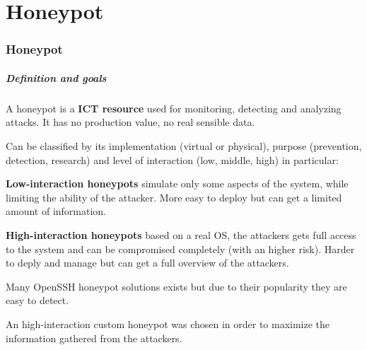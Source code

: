 \part{Honeypot}
\section{Honeypot}

\begin{frame}
	\partpage
\end{frame}

\begin{frame}
	\frametitle{Definition and goals}
	
	A honeypot is a \textbf{ICT resource} used for monitoring, detecting and analyzing attacks. It has no production value, no real sensible data. 
	
	\smallskip

	Can be classified by its implementation (virtual or physical), purpose (prevention, detection, research) and level of interaction (low, middle, high) in particular:
	
	\medskip

	\textbf{Low-interaction honeypots} simulate only some aspects of the system, while limiting the ability of the attacker. More easy to deploy but can get a limited amount of information.
	
	\medskip
	
	\textbf{High-interaction honeypots} based on a real OS, the attackers gets full access to the system and can be compromised completely (with an higher risk). Harder to deply and manage but can get a full overview of the attackers.
	
	\medskip

  Many OpenSSH honeypot solutions exists but due to their popularity they are easy to detect.
  
	\smallskip

  An high-interaction custom honeypot was chosen in order to maximize the information gathered from the attackers.
  	
\end{frame}


